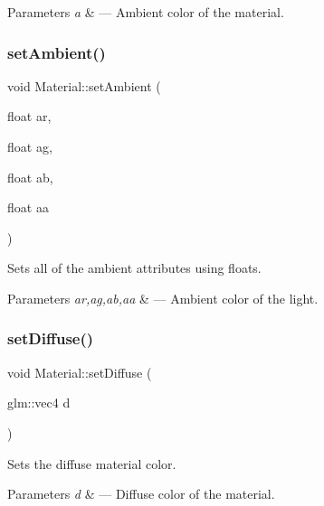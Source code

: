 \begin{DoxyParams}{Parameters}
{\em a} & --- Ambient color of the material. \\
\hline
\end{DoxyParams}
\mbox{\label{class_material_ace31bcfa4a27db13a08fd377a14a6365}} 
\subsubsection{\texorpdfstring{set\+Ambient()}{setAmbient()}\hspace{0.1cm}{\footnotesize\ttfamily [2/2]}}
{\footnotesize\ttfamily void Material\+::set\+Ambient (\begin{DoxyParamCaption}\item[{float}]{ar,  }\item[{float}]{ag,  }\item[{float}]{ab,  }\item[{float}]{aa }\end{DoxyParamCaption})}



Sets all of the ambient attributes using floats. 


\begin{DoxyParams}{Parameters}
{\em ar,ag,ab,aa} & --- Ambient color of the light. \\
\hline
\end{DoxyParams}
\mbox{\label{class_material_a700d4a180aeef13e35bb937d4da541df}} 
\subsubsection{\texorpdfstring{set\+Diffuse()}{setDiffuse()}\hspace{0.1cm}{\footnotesize\ttfamily [1/2]}}
{\footnotesize\ttfamily void Material\+::set\+Diffuse (\begin{DoxyParamCaption}\item[{glm\+::vec4}]{d }\end{DoxyParamCaption})}



Sets the diffuse material color. 


\begin{DoxyParams}{Parameters}
{\em d} & --- Diffuse color of the material. \\
\hline
\end{DoxyParams}
\mbox{\label{class_material_aff3b4318d5fe7e4072a586f7d30d7f32}} 
